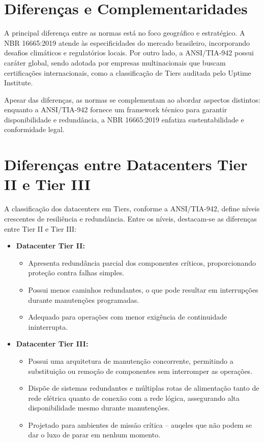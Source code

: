 \documentclass[12pt]{article}
\begin{document}
\section*{Diferenças e Complementaridades}
A principal diferença entre as normas está no foco geográfico e estratégico. A NBR 16665:2019 atende às especificidades do mercado brasileiro, incorporando desafios climáticos e regulatórios locais. Por outro lado, a ANSI/TIA-942 possui caráter global, sendo adotada por empresas multinacionais que buscam certificações internacionais, como a classificação de Tiers auditada pelo Uptime Institute.

Apesar das diferenças, as normas se complementam ao abordar aspectos distintos: enquanto a ANSI/TIA-942 fornece um framework técnico para garantir disponibilidade e redundância, a NBR 16665:2019 enfatiza sustentabilidade e conformidade legal.

\section*{Diferenças entre Datacenters Tier II e Tier III}
A classificação dos datacenters em Tiers, conforme a ANSI/TIA-942, define níveis crescentes de resiliência e redundância. Entre os níveis, destacam-se as diferenças entre Tier II e Tier III:

\begin{itemize}
    \item \textbf{Datacenter Tier II:} 
    \begin{itemize}
        \item Apresenta redundância parcial dos componentes críticos, proporcionando proteção contra falhas simples.
        \item Possui menos caminhos redundantes, o que pode resultar em interrupções durante manutenções programadas.
        \item Adequado para operações com menor exigência de continuidade ininterrupta.
    \end{itemize}
    \item \textbf{Datacenter Tier III:}
    \begin{itemize}
        \item Possui uma arquitetura de manutenção concorrente, permitindo a substituição ou remoção de componentes sem interromper as operações.
        \item Dispõe de sistemas redundantes e múltiplas rotas de alimentação tanto de rede elétrica quanto de conexão com a rede lógica, assegurando alta disponibilidade mesmo durante manutenções.
        \item Projetado para ambientes de missão crítica -- auqeles que não podem se dar o luxo de parar em nenhum momento.
    \end{itemize}
\end{itemize}
\end{document}
